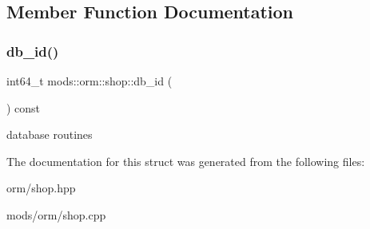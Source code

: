 \subsection{Member Function Documentation}
\mbox{\label{structmods_1_1orm_1_1shop_a696c01543bff9b376b37136834c5c285}} 
\subsubsection{\texorpdfstring{db\+\_\+id()}{db\_id()}}
{\footnotesize\ttfamily int64\+\_\+t mods\+::orm\+::shop\+::db\+\_\+id (\begin{DoxyParamCaption}{ }\end{DoxyParamCaption}) const}

database routines 

The documentation for this struct was generated from the following files\+:\begin{DoxyCompactItemize}
\item 
orm/shop.\+hpp\item 
mods/orm/shop.\+cpp\end{DoxyCompactItemize}

